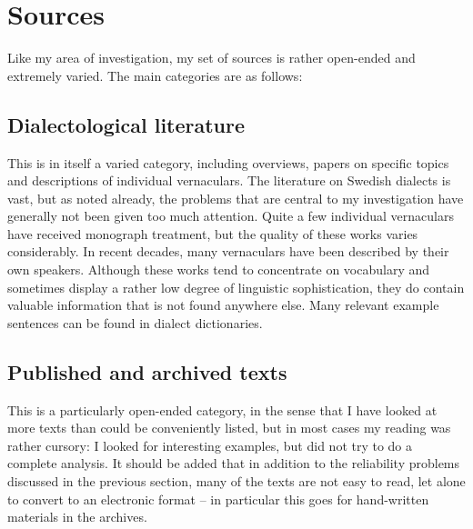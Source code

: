 
\section{Sources}

Like my area of investigation, my set of sources is rather open-ended and extremely varied. The main categories are as follows:


\subsection{Dialectological literature}
This is in itself a varied category, including overviews, papers on specific topics and descriptions of individual vernaculars. The literature on Swedish dialects is vast, but as noted already, the problems that are central to my investigation have generally not been given too much attention. Quite a few individual vernaculars have received monograph treatment, but the quality of these works varies considerably. In recent decades, many vernaculars have been described by their own speakers. Although these works tend to concentrate on vocabulary and sometimes display a rather low degree of linguistic sophistication, they do contain valuable information that is not found anywhere else. Many relevant example sentences can be found in dialect dictionaries. 


\subsection{Published and archived texts}
 This is a particularly open-ended category, in the sense that I have looked at more texts than could be conveniently listed, but in most cases my reading was rather cursory: I looked for interesting examples, but did not try to do a complete analysis. It should be added that in addition to the reliability problems discussed in the previous section, many of the texts are not easy to read, let alone to convert to an electronic format – in particular this goes for hand-written materials in the archives. 

